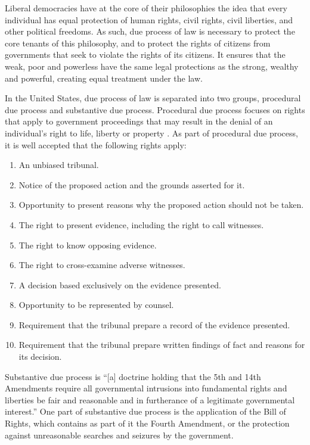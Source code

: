 \documentclass[12pt]{article} %
\begin{document}
Liberal democracies have at the core of their philosophies the idea that every individual has equal protection of human rights, civil rights, civil liberties, and other political freedoms. As such, due process of law is necessary to protect the core tenants of this philosophy, and to protect the rights of citizens from governments that seek to violate the rights of its citizens. It ensures that the weak, poor and powerless have the same legal protections as the strong, wealthy and powerful, creating equal treatment under the law.

In the United States, due process of law is separated into two groups, procedural due process and substantive due process. Procedural due process focuses on rights that apply to government proceedings that may result in the denial of an individual's right to life, liberty or property \cite{wex_procedural}. As part of procedural due process, it is well accepted that the following rights apply: \cite{friendly}

\begin{enumerate}
\item An unbiased tribunal.
\item Notice of the proposed action and the grounds asserted for it.
\item Opportunity to present reasons why the proposed action should not be taken.
\item The right to present evidence, including the right to call witnesses.
\item The right to know opposing evidence.
\item The right to cross-examine adverse witnesses.
\item A decision based exclusively on the evidence presented.
\item Opportunity to be represented by counsel.
\item Requirement that the tribunal prepare a record of the evidence presented.
\item Requirement that the tribunal prepare written findings of fact and reasons for its decision.
\end{enumerate}

Substantive due process is ``[a] doctrine holding that the 5th and 14th Amendments require all governmental intrusions into fundamental rights and liberties be fair and reasonable and in furtherance of a legitimate governmental interest.'' \cite{wex_substantive} One part of substantive due process is the application of the Bill of Rights, which contains as part of it the Fourth Amendment, or the protection against unreasonable searches and seizures by the government.
\end{document}
